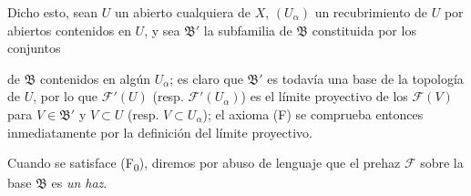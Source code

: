 \begin{env}[3.2.2]
Dicho esto, sean $U$ un abierto cualquiera de $X$, $(U_\alpha)$ un recubrimiento
de $U$ por abiertos contenidos en $U$, y sea $\mathfrak{B}'$ la
subfamilia de $\mathfrak{B}$ constituida por los conjuntos


de $\mathfrak{B}$ contenidos en algún $U_\alpha$; es claro que
$\mathfrak{B}'$ es todavía una base de la topología de $U$, por lo que
$\mathcal{F}'(U)$ (resp. $\mathcal{F}'(U_\alpha)$) es el límite proyectivo de los
$\mathcal{F}(V)$ para $V\in\mathfrak{B}'$ y $V\subset U$ (resp.
$V\subset U_\alpha$); el axioma (F) se comprueba entonces inmediatamente por la
definición del límite proyectivo.

Cuando se satisface (F\textsubscript{0}), diremos por abuso de lenguaje que
el prehaz $\mathcal{F}$ sobre la base $\mathfrak{B}$ es \emph{un haz}.
\end{env}
